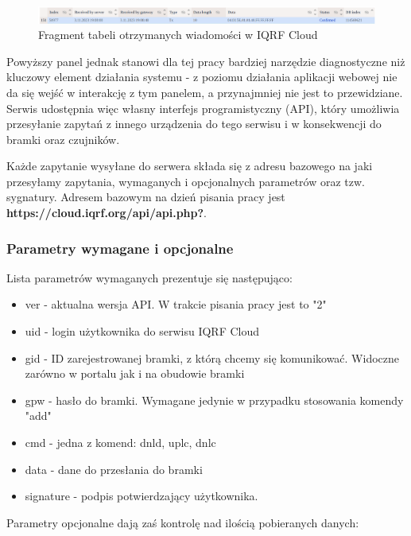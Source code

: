 \documentclass[a4paper, 12pt]{article}
\begin{document}
\begin{figure}[H]
    \includegraphics[width=\textwidth]{zdj/cloud-records.png}
    \caption{Fragment tabeli otrzymanych wiadomości w IQRF Cloud}
\end{figure}

Powyższy panel jednak stanowi dla tej pracy bardziej narzędzie diagnostyczne niż kluczowy element działania systemu - z poziomu działania aplikacji
webowej nie da się wejść w interakcję z tym panelem, a przynajmniej nie jest to przewidziane. Serwis udostępnia więc własny interfejs 
programistyczny (API), który umożliwia przesyłanie zapytań z innego urządzenia do tego serwisu i w konsekwencji do bramki oraz czujników.

Każde zapytanie wysyłane do serwera składa się z adresu bazowego na jaki przesyłamy zapytania, wymaganych i opcjonalnych parametrów oraz tzw. 
sygnatury. Adresem bazowym na dzień pisania pracy jest \textbf{https://cloud.iqrf.org/api/api.php?}.

\subsubsection{Parametry wymagane i opcjonalne}

Lista parametrów wymaganych prezentuje się następująco:

\begin{itemize}
    \item ver - aktualna wersja API. W trakcie pisania pracy jest to "2" 
    \item uid - login użytkownika do serwisu IQRF Cloud
    \item gid - ID zarejestrowanej bramki, z którą chcemy się komunikować. Widoczne zarówno w portalu jak i na obudowie bramki
    \item gpw - hasło do bramki. Wymagane jedynie w przypadku stosowania komendy "add"
    \item cmd - jedna z komend: dnld, uplc, dnlc
    \item data - dane do przesłania do bramki
    \item signature - podpis potwierdzający użytkownika.
\end{itemize}

Parametry opcjonalne dają zaś kontrolę nad ilością pobieranych danych:
\end{document}
